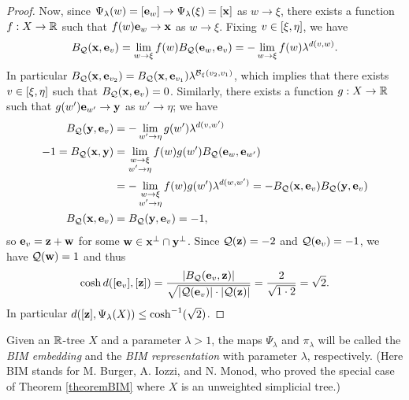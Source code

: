 \begin{proof}
Now, since $\Psi_\lambda(w) = [\mathbf e_w]\to \Psi_\lambda(\xi) = [\mathbf x]$ as $w\to\xi$, there exists a function $f:X\to\R$ such that $f(w)\mathbf e_w\to \mathbf x$ as $w\to\xi$. Fixing $v\in[\xi,\eta]$, we have
\[
B_\mathcal Q(\mathbf x,\mathbf e_v) = \lim_{w\to\xi} f(w)B_\mathcal Q(\mathbf e_w,\mathbf e_v) = -\lim_{w\to\xi} f(w) \lambda^{d(v,w)}.
\]
In particular $B_\mathcal Q(\mathbf x,\mathbf e_{v_2}) = B_\mathcal Q(\mathbf x,\mathbf e_{v_1}) \lambda^{\operatorname{\mathcal B}_\xi(v_2,v_1)}$, which implies that there exists $v\in[\xi,\eta]$ such that $B_\mathcal Q(\mathbf x,\mathbf e_v) = 0$. Similarly, there exists a function $g:X\to\R$ such that $g(w')\mathbf e_{w'}\to\mathbf y$ as $w'\to\eta$; we have
\begin{align*}
B_\mathcal Q(\mathbf y,\mathbf e_v) &= -\lim_{w'\to\eta} g(w') \lambda^{d(v,w')}\\
-1 = B_\mathcal Q(\mathbf x,\mathbf y) &= \lim_{\substack{w\to\xi \\ w'\to\eta}} f(w) g(w') B_\mathcal Q(\mathbf e_w,\mathbf e_{w'})\\
&= -\lim_{\substack{w\to\xi \\ w'\to\eta}} f(w) g(w') \lambda^{d(w,w')}
= -B_\mathcal Q(\mathbf x,\mathbf e_v) B_\mathcal Q(\mathbf y,\mathbf e_v)\\
B_\mathcal Q(\mathbf x,\mathbf e_v) &= B_\mathcal Q(\mathbf y,\mathbf e_v) = -1,
\end{align*}
so $\mathbf e_v = \mathbf z + \mathbf w$ for some $\mathbf w\in \mathbf x^\perp\cap \mathbf y^\perp$. Since $\mathcal Q(\mathbf z) = -2$ and $\mathcal Q(\mathbf e_v) = -1$, we have $\mathcal Q(\mathbf w) = 1$ and thus
\[
\cosh d([\mathbf e_v],[\mathbf z]) = \frac{|B_\mathcal Q(\mathbf e_v,\mathbf z)|}{\sqrt{|\mathcal Q(\mathbf e_v)|\cdot|\mathcal Q(\mathbf z)|}} = \frac{2}{\sqrt{1\cdot 2}} = \sqrt 2.
\]
In particular $d([\mathbf z],\Psi_\lambda(X)) \leq \cosh^{-1}(\sqrt 2)$. 
\end{proof}

\begin{definition}
\label{definitionBIM}
Given an $\R$-tree $X$ and a parameter $\lambda > 1$, the maps $\Psi_\lambda$ and $\pi_\lambda$ will be called the \emph{BIM embedding} and the \emph{BIM representation} with parameter $\lambda$, respectively. (Here BIM stands for M. Burger, A. Iozzi, and N. Monod, who proved the special case of Theorem \ref{theoremBIM} where $X$ is an unweighted simplicial tree.)
\end{definition}

